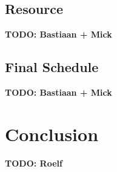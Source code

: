 \documentclass{article}
\newcommand{\TODO}[1]{{\color{red}\textbf{TODO: #1}}}
\begin{document}
\subsection{Resource}

\TODO{Bastiaan + Mick}

\subsection{Final Schedule}

\TODO{Bastiaan + Mick}


\newpage


\section{Conclusion}

\TODO{Roelf}


\citet{brucker99}

\citet{herroelen05}

\citet{policella07}

\citet{lombardi10}

\citet{cesta98}

\citet{deblaere10}


\newpage


\end{document}
